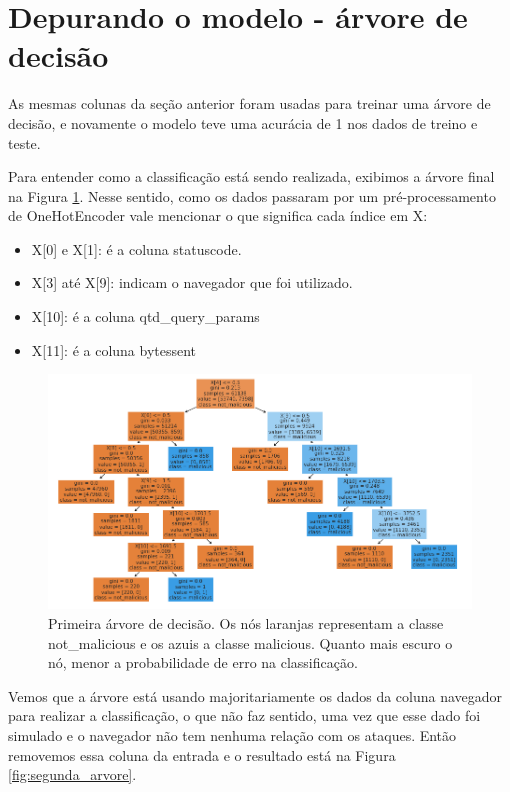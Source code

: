 \section{Depurando o modelo - árvore de decisão}

As mesmas colunas da seção anterior foram usadas para treinar uma árvore de decisão, e novamente
o modelo teve uma acurácia de 1 nos dados de treino e teste. 

Para entender como a classificação está sendo realizada, exibimos a árvore final na Figura \ref{fig:primeira_arvore}. Nesse sentido, 
como os dados passaram por um pré-processamento de OneHotEncoder vale mencionar o que significa cada índice em X:

\begin{itemize}
    \item X[0] e X[1]: é a coluna statuscode.
    \item X[3] até X[9]: indicam o navegador que foi utilizado.
    \item X[10]: é a coluna qtd\_query\_params
    \item X[11]: é a coluna bytessent
\end{itemize}

\begin{figure}
    \centering
    \includegraphics[width=.9\textwidth]{figuras/primeira-arvore.png}
    \caption{Primeira árvore de decisão. Os nós laranjas representam a classe not\_malicious 
    e os azuis a classe malicious. Quanto mais escuro o nó, menor a probabilidade de erro 
    na classificação. \label{fig:primeira_arvore}}    
\end{figure}

Vemos que a árvore está usando majoritariamente os dados da coluna navegador 
para realizar a classificação, o que não faz sentido, uma vez que esse dado foi simulado e o 
navegador não tem nenhuma relação com os ataques. Então removemos essa coluna da entrada 
e o resultado está na Figura \ref{fig:segunda_arvore}.


